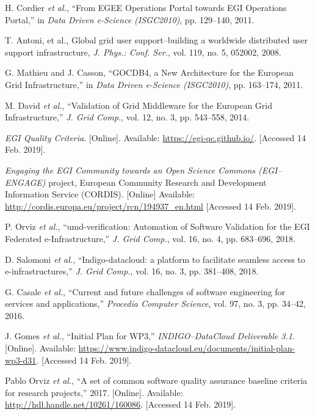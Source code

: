 \begin{thebibliography}{1}
H. Cordier \emph{et al.},
``From EGEE Operations Portal towards EGI Operations Portal,''
in \emph{Data Driven e-Science (ISGC2010)},
pp. 129--140, 2011.

T. Antoni, et al.,
Global grid user support--building a worldwide distributed user support infrastructure,
\emph{J. Phys.: Conf. Ser.},
vol. 119, no. 5, 052002, 2008.

G. Mathieu and J. Casson,
``GOCDB4, a New Architecture for the European Grid Infrastructure,''
in \emph{Data Driven e-Science (ISGC2010)},
pp. 163--174, 2011.

M. David \emph{et al.},
``Validation of Grid Middleware for the European Grid Infrastructure,''
\emph{J. Grid Comp.},
vol. 12, no. 3, pp. 543--558, 2014.

\emph{EGI Quality Criteria}.
[Online]. Available: \url{https://egi-qc.github.io/}.
[Accessed 14 Feb. 2019].

\emph{Engaging the EGI Community towards an Open Science Commons (EGI--ENGAGE)}
project, European Community Research and Development Information Service (CORDIS).
[Online] Available: \url{http://cordis.europa.eu/project/rcn/194937_en.html}
[Accessed 14 Feb. 2019].

P. Orviz \emph{et al.},
``umd-verification: Automation of Software Validation for the EGI Federated e-Infrastructure,''
\emph{J. Grid Comp.},
vol. 16, no. 4, pp. 683--696, 2018.

D. Salomoni \emph{et al.},
``Indigo-datacloud: a platform to facilitate seamless access to e-infrastructures,''
\emph{J. Grid Comp.},
vol. 16, no. 3, pp. 381--408, 2018.

G. Casale \emph{et al.},
``Current and future challenges of software engineering for services and applications,''
\emph{Procedia Computer Science},
vol. 97, no. 3, pp. 34--42, 2016.

J. Gomes \emph{et al.},
``Initial Plan for WP3,''
\emph{INDIGO--DataCloud Deliverable 3.1}.
[Online]. Available: \url{https://www.indigo-datacloud.eu/documents/initial-plan-wp3-d31}.
[Accessed 14 Feb. 2019].

Pablo Orviz \emph{et al.},
``A set of common software quality assurance baseline criteria for research projects,''
2017.
[Online]. Available: \url{http://hdl.handle.net/10261/160086}.
[Accessed 14 Feb. 2019].


\end{thebibliography}
